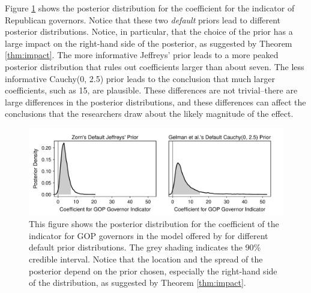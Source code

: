 \documentclass[12pt]{article}
\begin{document}
Figure \ref{fig:bf-posterior-density-illustrate-importance} shows the posterior distribution for the coefficient for the indicator of Republican governors. Notice that these two \emph{default} priors lead to different posterior distributions. Notice, in particular, that the choice of the prior has a large impact on the right-hand side of the posterior, as suggested by Theorem \ref{thm:impact}. The more informative Jeffreys' prior leads to a more peaked posterior distribution that rules out coefficients larger than about seven. The less informative Cauchy(0, 2.5) prior leads to the conclusion that much larger coefficients, such as 15, are plausible. These differences are not trivial--there are large differences in the posterior distributions, and these differences can affect the conclusions that the researchers draw about the likely magnitude of the effect.

\begin{figure}[H]
\begin{center}
\includegraphics[scale = .8]{figs/br-posterior-density-illustrate-importance.pdf}
\caption{This figure shows the posterior distribution for the coefficient of the indicator for GOP governors in the model offered by \cite{BarrilleauxRainey2014} for different default prior distributions. The grey shading indicates the 90\% credible interval. Notice that the location and the spread of the posterior depend on the prior chosen, especially the right-hand side of the distribution, as suggested by Theorem \ref{thm:impact}.}\label{fig:bf-posterior-density-illustrate-importance}
\end{center}
\end{figure}
\end{document}
